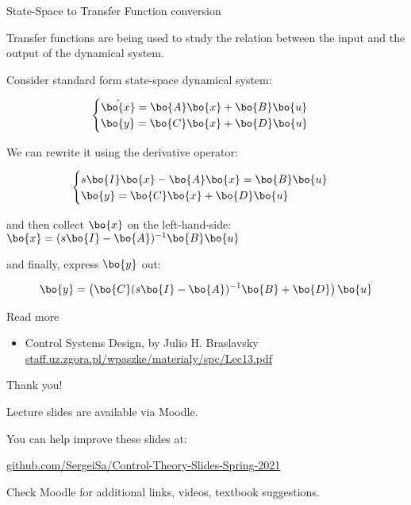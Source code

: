 \documentclass{beamer}
\begin{document}
\begin{frame}{State-Space to Transfer Function conversion}
\begin{flushleft}

Transfer functions are being used to study the relation between the input and the output of the dynamical system.

\bigskip

Consider standard form state-space dynamical system:

\begin{equation}
\begin{cases}
\dot{\bo{x}} = \bo{A}\bo{x} + \bo{B}\bo{u} \\
     \bo{y}  = \bo{C}\bo{x} + \bo{D}\bo{u}
\end{cases}
\end{equation}

We can rewrite it using the derivative operator:

\begin{equation}
\begin{cases}
s\bo{I}\bo{x} -\bo{A}\bo{x} = \bo{B}\bo{u} \\
\bo{y}  = \bo{C}\bo{x} + \bo{D}\bo{u}
\end{cases}
\end{equation}

and then collect $\bo{x}$ on the left-hand-side: $\bo{x} = (s\bo{I} -\bo{A})^{-1} \bo{B}\bo{u}$

and finally, express $\bo{y}$ out:

\begin{equation}
\bo{y}  = \left( \bo{C}(s\bo{I} -\bo{A})^{-1} \bo{B} + \bo{D} \right) \bo{u}
\end{equation}

\end{flushleft}
\end{frame}




\begin{frame}{Read more}

\begin{itemize}
\item Control Systems Design, by Julio H. Braslavsky \href{http://staff.uz.zgora.pl/wpaszke/materialy/spc/Lec13.pdf}{staff.uz.zgora.pl/wpaszke/materialy/spc/Lec13.pdf}


\end{itemize}

\end{frame}



\begin{frame}{Thank you!}
\centerline{Lecture slides are available via Moodle.}
\bigskip
\centerline{You can help improve these slides at:}
\centerline{\href{https://github.com/SergeiSa/Control-Theory-Slides-Spring-2021}{github.com/SergeiSa/Control-Theory-Slides-Spring-2021}}
\bigskip
\centerline{Check Moodle for additional links, videos, textbook suggestions.}
\end{frame}
\end{document}
